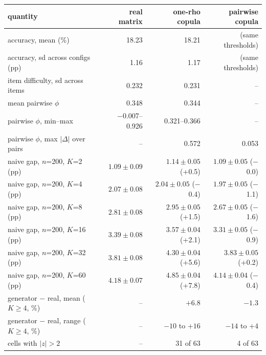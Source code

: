 {\footnotesize\setlength{\tabcolsep}{3.5pt}
\begin{tabular}{lrrr}
\toprule
quantity & real matrix & one-rho copula & pairwise copula \\
\midrule
accuracy, mean (\%) & 18.23 & 18.21 & (same thresholds) \\
accuracy, sd across configs (pp) & 1.16 & 1.17 & (same thresholds) \\
item difficulty, sd across items & 0.232 & 0.231 & -- \\
mean pairwise $\phi$ & 0.348 & 0.344 & -- \\
pairwise $\phi$, min--max & $-$0.007--0.926 & 0.321--0.366 & -- \\
pairwise $\phi$, max $|\Delta|$ over pairs & -- & 0.572 & 0.053 \\
\midrule
naive gap, $n$=200, $K$=2 (pp) & $1.09 \pm 0.09$ & $1.14 \pm 0.05$ (+0.5) & $1.09 \pm 0.05$ ($-$0.0) \\
naive gap, $n$=200, $K$=4 (pp) & $2.07 \pm 0.08$ & $2.04 \pm 0.05$ ($-$0.4) & $1.97 \pm 0.05$ ($-$1.1) \\
naive gap, $n$=200, $K$=8 (pp) & $2.81 \pm 0.08$ & $2.95 \pm 0.05$ (+1.5) & $2.67 \pm 0.05$ ($-$1.6) \\
naive gap, $n$=200, $K$=16 (pp) & $3.39 \pm 0.08$ & $3.57 \pm 0.04$ (+2.1) & $3.31 \pm 0.05$ ($-$0.9) \\
naive gap, $n$=200, $K$=32 (pp) & $3.81 \pm 0.08$ & $4.30 \pm 0.04$ (+5.6) & $3.83 \pm 0.05$ (+0.2) \\
naive gap, $n$=200, $K$=60 (pp) & $4.18 \pm 0.07$ & $4.85 \pm 0.04$ (+7.8) & $4.14 \pm 0.04$ ($-$0.4) \\
\midrule
generator $-$ real, mean ($K\ge4$, \%) & -- & $+6.8$ & $-1.3$ \\
generator $-$ real, range ($K\ge4$, \%) & -- & $-10$ to $+16$ & $-14$ to $+4$ \\
cells with $|z|>2$ & -- & 31 of 63 & 4 of 63 \\
\bottomrule
\end{tabular}}
